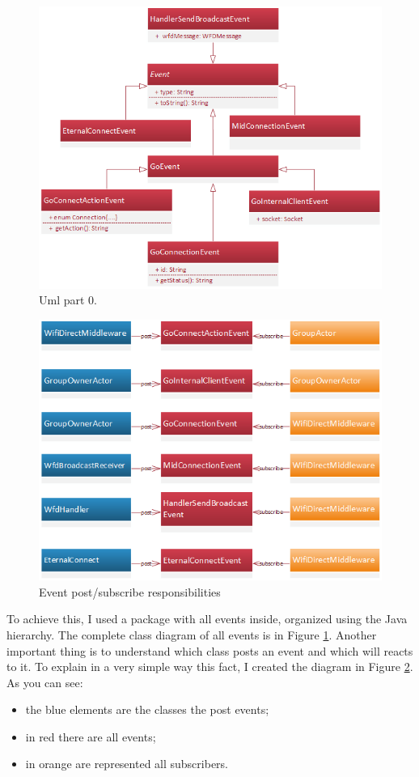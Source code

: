 \begin{figure}[thpb]
	\centering
	\includegraphics[scale=0.7]{./images/chap2/event-hyerarchy.png}
	\caption{Uml part 0.}
	\label{event-hyeranchy}
\end{figure}	

\begin{figure}[thpb]
	\centering
	\includegraphics[scale=0.7]{./images/chap2/event-subscribe-post.png}
	\caption{Event post/subscribe responsibilities}
	\label{event-subscribe-post}
\end{figure}	

To achieve this, I used a package with all events inside, organized using the Java hierarchy. The complete class diagram of all events is in Figure \ref{event-hyeranchy}.
Another important thing is to understand which class posts an event and which will reacts to it. To explain in a very simple way this fact, I created the diagram in Figure \ref{event-subscribe-post}. As you can see:
\begin{itemize}
	\item the blue elements are the classes the post events;
	\item in red there are all events;
	\item in orange are represented all subscribers.
\end{itemize}

